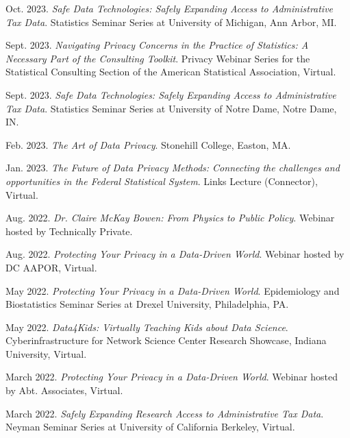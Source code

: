 \begin{etaremune}[topsep=0pt, itemsep=4pt, partopsep=0pt, parsep=0pt]
    \item Oct. 2023. \textit{Safe Data Technologies: Safely Expanding Access to Administrative Tax Data}. Statistics Seminar Series at University of Michigan, Ann Arbor, MI.

    \item Sept. 2023. \textit{Navigating Privacy Concerns in the Practice of Statistics: A Necessary Part of the Consulting Toolkit}. Privacy Webinar Series for the Statistical Consulting Section of the American Statistical Association, Virtual.    
    
    \item Sept. 2023. \textit{Safe Data Technologies: Safely Expanding Access to Administrative Tax Data}. Statistics Seminar Series at University of Notre Dame, Notre Dame, IN.
    
    \item Feb. 2023. \textit{The Art of Data Privacy}. Stonehill College, Easton, MA.
    
    \item Jan. 2023. \textit{The Future of Data Privacy Methods: Connecting the challenges and opportunities in the Federal Statistical System}. Links Lecture (Connector), Virtual.
    
    \item Aug. 2022. \textit{Dr. Claire McKay Bowen: From Physics to Public Policy}. Webinar hosted by Technically Private.
    
    \item Aug. 2022. \textit{Protecting Your Privacy in a Data-Driven World}. Webinar hosted by DC AAPOR, Virtual.
    
    \item May 2022. \textit{Protecting Your Privacy in a Data-Driven World}. Epidemiology and Biostatistics Seminar Series at Drexel University, Philadelphia, PA.
    
    \item May 2022. \textit{Data4Kids: Virtually Teaching Kids about Data Science}. Cyberinfrastructure for Network Science Center Research Showcase, Indiana University, Virtual.
    
    \item March 2022. \textit{Protecting Your Privacy in a Data-Driven World}. Webinar hosted by Abt. Associates, Virtual.
    
    \item March 2022. \textit{Safely Expanding Research Access to Administrative Tax Data}. Neyman Seminar Series at University of California Berkeley, Virtual.
    

\end{etaremune}
